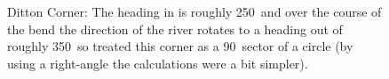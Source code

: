       \begin{figure}
      \begin{center}
        \caption{Ditton Corner: The heading in is roughly 250\textdegree\ and over the course of the bend the direction of the river rotates to a heading out of roughly 350\textdegree\ so treated this corner as a 90\textdegree\ sector of a circle (by using a right-angle the calculations were a bit simpler).}
        \label{fig:dittoncorner:angle}
      \end{center}
      \end{figure}
      
